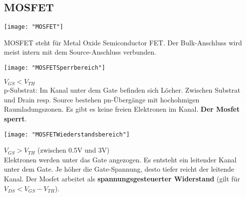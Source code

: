 \subsection{MOSFET}
\begin{minipage}[t]{0.3\textwidth}
	\vspace{0pt}								%
	\texttt{[image: "MOSFET"]}
\end{minipage}\hspace{0.05\textwidth}
\begin{minipage}[t]{0.65\textwidth}
	\vspace{0pt}								%
	MOSFET steht für Metal Oxide Semiconductor FET. Der Bulk-Anschluss wird meist intern mit dem
	Source-Anschluss verbunden. \\
\end{minipage}
\vspace{2mm}

\begin{minipage}[t]{0.3\textwidth}
	\vspace{0pt}								%
	\texttt{[image: "MOSFETSperrbereich"]}
\end{minipage}\hspace{0.05\textwidth}
\begin{minipage}[t]{0.65\textwidth}
	\vspace{0pt}								%
	$V_{GS} < V_{TH}$\\
	p-Substrat: Im Kanal unter dem Gate befinden sich Löcher.
	Zwischen Substrat und Drain resp. Source bestehen pn-Übergänge mit hochohmigen
	Raumladungszonen. Es gibt es keine freien Elektronen im Kanal. \textbf{Der Mosfet sperrt}.
	
\end{minipage}
\vspace{2mm}

\begin{minipage}[t]{0.3\textwidth}
	\vspace{0pt}								%
	\texttt{[image: "MOSFETWiederstandsbereich"]}
\end{minipage}\hspace{0.05\textwidth}
\begin{minipage}[t]{0.65\textwidth}
	\vspace{0pt}								%
	$V_{GS} > V_{TH}$ (zwischen 0.5V und 3V)\\
	Elektronen werden unter das Gate angezogen. Es entsteht ein leitender Kanal unter dem Gate.
	Je höher die Gate-Spannung, desto tiefer reicht der leitende Kanal. Der Mosfet arbeitet als
	\textbf{spannungsgesteuerter Widerstand} (gilt für $V_{DS} < V_{GS} - V_{TH}$).\\	
\end{minipage}
\vspace{2mm}

